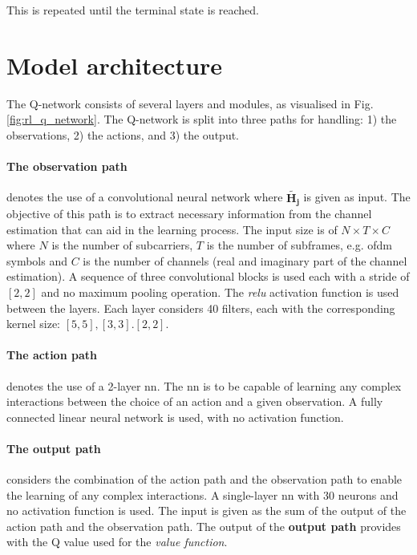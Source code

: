 This is repeated until the terminal state is reached.

\section{Model architecture}
The Q-network consists of several layers and modules, as visualised in Fig. \ref{fig:rl_q_network}. The Q-network is split into three paths for handling: 1) the observations, 2) the actions, and 3) the output. 

\paragraph{The \textbf{observation path}} denotes the use of a convolutional neural network where $\widetilde{\mathbf{H_j}}$ is given as input. The objective of this path is to extract necessary information from the channel estimation that can aid in the learning process. The input size is of $N \times T \times C$ where $N$ is the number of subcarriers, $T$ is the number of subframes, e.g. \gls{ofdm} symbols and $C$ is the number of channels (real and imaginary part of the channel estimation). A sequence of three convolutional blocks is used each with a stride of $[2, 2]$ and no maximum pooling operation. The \textit{\gls{relu}} activation function is used between the layers. Each layer considers 40 filters, each with the corresponding kernel size: $[5,5], [3,3]. [2,2]$. 

\paragraph{The \textbf{action path}} denotes the use of a 2-layer \gls{nn}. The \gls{nn} is to be capable of learning any complex interactions between the choice of an action and a given observation. A fully connected linear neural network is used, with no activation function. 

\paragraph{The \textbf{output path}} considers the combination of the action path and the observation path to enable the learning of any complex interactions. A single-layer \gls{nn} with $30$ neurons and no activation function is used. The input is given as the sum of the output of the action path and the observation path. The output of the \textbf{output path} provides with the Q value used for the \textit{value function}. 

